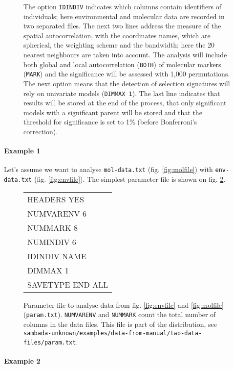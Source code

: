 \documentclass[a4paper,11pt]{article}
\newcommand{\versionnumber}{unknown}
\newcommand{\pathtodatafrommanual}{\texttt{sambada-\versionnumber/examples/data-from-manual/}}
\newcommand{\pathtotwodatafiles}{\pathtodatafrommanual\texttt{two-data-files/}}
\begin{document}
\begin{figure}[htbp]
{The option \texttt{IDINDIV} indicates which columns contain identifiers of individuals; here environmental and molecular data are recorded in two separated files.
The next two lines address the measure of the spatial autocorrelation, with the coordinates names, which are spherical, the weighting scheme and the bandwidth; here the 20 nearest neighbours are taken into account.
The analysis will include both global and local autocorrelation (\texttt{BOTH}) of molecular markers (\texttt{MARK}) and the significance will be assessed with 1,000 permutations.
The next option means that the detection of selection signatures will rely on univariate models (\texttt{DIMMAX 1}).
The last line indicates that results will be stored at the end of the process, that only significant models with a significant parent will be stored and that the threshold for significance is set to 1\% (before Bonferroni's correction).
}
\label{fig:fichier-param-general}
\end{figure}

\paragraph{Example 1} 
Let's assume we want to analyse \verb+mol-data.txt+ (fig. \ref{fig:molfile}) with \verb+env-data.txt+ (fig. \ref{fig:envfile}).
The simplest parameter file is shown on fig. \ref{fig:fichier-param}.

\begin{figure}[htbp]
\centering
\ttfamily
\begin{tabular}{|l|}
\hline
HEADERS YES\\	
NUMVARENV 6\\	
NUMMARK 8	\\
NUMINDIV 6\\
IDINDIV NAME\\
DIMMAX 1\\
SAVETYPE END ALL\\
\hline
\end{tabular}%
\caption{Parameter file to analyse data from fig. \ref{fig:envfile} and \ref{fig:molfile} (\texttt{param.txt}). 
\texttt{NUMVARENV} and \texttt{NUMMARK} count the total number of columns in the data files.
This file is part of the distribution, see \pathtotwodatafiles\texttt{param.txt}.
}
\label{fig:fichier-param}
\end{figure}


\paragraph{Example 2} 
\end{document}
